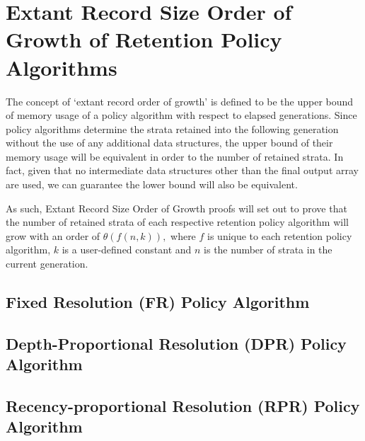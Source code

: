 \printunsrtglossary[numberedsection=autolabel]



\section{Extant Record Size Order of Growth of Retention Policy Algorithms} \label{sec:extant_record_oog}
The concept of `extant record order of growth' is defined to be the upper bound of memory usage of a policy algorithm with respect to elapsed generations.
Since policy algorithms determine the strata retained into the following generation without the use of any additional data structures, the upper bound of their memory usage will be equivalent in order to the number of retained strata.
In fact, given that no intermediate data structures other than the final output array are used, we can guarantee the lower bound will also be equivalent.

As such, Extant Record Size Order of Growth proofs will set out to prove that the number of retained strata of each respective retention policy algorithm will grow with an order of $\mathcal{\theta}(f(n, k)),$ where $f$ is unique to each retention policy algorithm, $k$ is a user-defined constant and $n$ is the number of strata in the current generation.

\subsection{Fixed Resolution (FR) Policy Algorithm}




% 
% 

\subsection{Depth-Proportional Resolution (DPR) Policy Algorithm}




% 
% 

\subsection{Recency-proportional Resolution (RPR) Policy Algorithm}


